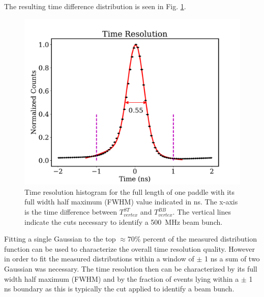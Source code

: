 The resulting time difference distribution is seen in Fig. \ref{fig:st_time_res}.
	\begin{figure}[!htb]
		\centering
		\includegraphics[width=1.0\linewidth]{performance/figs/tr_fit}
		\caption{Time resolution histogram for the full length of one paddle with its full width half maximum (FWHM) value indicated in ns.  The x-axis is the time difference between $T^{ST}_{vertex}$ and $T^{BB}_{vertex}$. The vertical lines indicate the cuts necessary to identify a 500~MHz beam bunch.}
		\label{fig:st_time_res}
	\end{figure}
Fitting a single Gaussian to the top $\approx 70\%$ percent of the measured distribution function can be used to characterize the overall time resolution quality. However in order to fit the measured distributions within a window of $\pm$ 1 ns a sum of two Gaussian was necessary. The time resolution then can be characterized by its full width half maximum (FWHM) and by the fraction of events lying within a $\pm$ 1 ns boundary as this is typically the cut applied to identify a beam bunch.  

